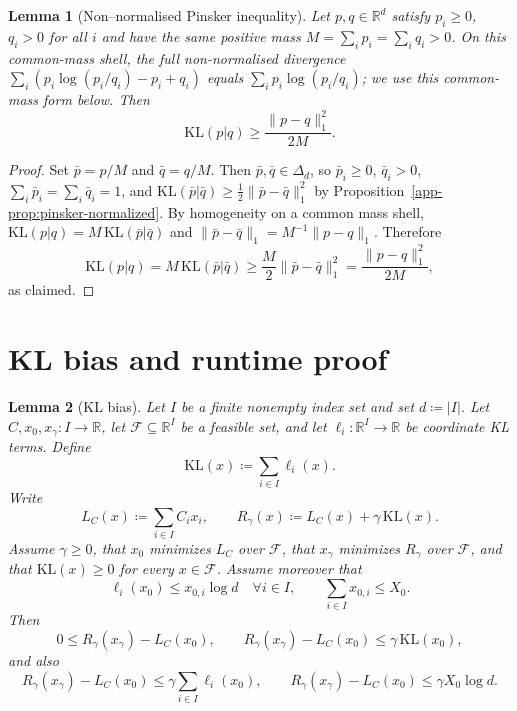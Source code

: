 \documentclass{article}
\theoremstyle{plain}
\newtheorem{lemma}{Lemma}[section]
\newcommand{\RR}{\mathbb{R}}
\newcommand{\KLdiv}[2]{\mathrm{KL}(#1|#2)}
\begin{document}
\begin{lemma}[Non--normalised Pinsker inequality]\label{app-lem:pinsker-nonnormalized}
Let $p,q\in\RR^d$ satisfy $p_i\ge0$, $q_i>0$ for all $i$ and have the
same positive mass $M=\sum_i p_i=\sum_i q_i>0$.  On this common-mass shell,
the full non-normalised divergence
$\sum_i(p_i\log(p_i/q_i)-p_i+q_i)$ equals $\sum_i p_i\log(p_i/q_i)$; we use
this common-mass form below. Then
\[
  \KLdiv{p}{q}
  \ge
  \frac{\|p-q\|_1^2}{2M}.
\]
\end{lemma}

\begin{proof}
Set $\bar p=p/M$ and $\bar q=q/M$. Then $\bar p,\bar q\in\Delta_d$, so
$\bar p_i\ge0$, $\bar q_i>0$, $\sum_i\bar p_i=\sum_i\bar q_i=1$, and
$\KLdiv{\bar p}{\bar q}\ge \frac12\|\bar p-\bar q\|_1^2$ by
Proposition~\ref{app-prop:pinsker-normalized}.
By homogeneity on a common mass shell,
$\KLdiv{p}{q}=M\,\KLdiv{\bar p}{\bar q}$ and
$\|\bar p-\bar q\|_1=M^{-1}\|p-q\|_1$.
Therefore
\[
  \KLdiv{p}{q}
  = M\,\KLdiv{\bar p}{\bar q}
  \ge
  \frac{M}{2}\|\bar p-\bar q\|_1^2
  =
  \frac{\|p-q\|_1^2}{2M},
\]
as claimed.
\end{proof}
\section{KL bias and runtime proof}
\label{app-app:kl-bias-runtime}

\begin{lemma}[KL bias]\label{app-lem:kl-bias}
Let $I$ be a finite nonempty index set and set $d\coloneqq |I|$.  Let
$C,x_0,x_\gamma:I\to\RR$, let $\mathcal F\subseteq\RR^I$ be a feasible
set, and let $\ell_i:\RR^I\to\RR$ be coordinate KL terms.  Define
\[
  \mathrm{KL}(x)\coloneqq\sum_{i\in I}\ell_i(x).
\]
Write
\[
  L_C(x)\coloneqq\sum_{i\in I} C_i x_i,
  \qquad
  R_\gamma(x)\coloneqq L_C(x)+\gamma\,\mathrm{KL}(x).
\]
Assume $\gamma\ge0$, that $x_0$ minimizes $L_C$ over $\mathcal F$, that
$x_\gamma$ minimizes $R_\gamma$ over $\mathcal F$, and that
$\mathrm{KL}(x)\ge0$ for every $x\in\mathcal F$.  Assume moreover that
\[
  \ell_i(x_0)\le x_{0,i}\log d\quad\forall i\in I,
  \qquad
  \sum_{i\in I}x_{0,i}\le X_0 .
\]
Then
\[
  0\le R_\gamma(x_\gamma)-L_C(x_0),
  \qquad
  R_\gamma(x_\gamma)-L_C(x_0)\le \gamma\,\mathrm{KL}(x_0),
\]
and also
\[
  R_\gamma(x_\gamma)-L_C(x_0)
  \le \gamma\sum_{i\in I}\ell_i(x_0),
  \qquad
  R_\gamma(x_\gamma)-L_C(x_0)\le \gamma X_0\log d .
\]
\end{lemma}
\end{document}
